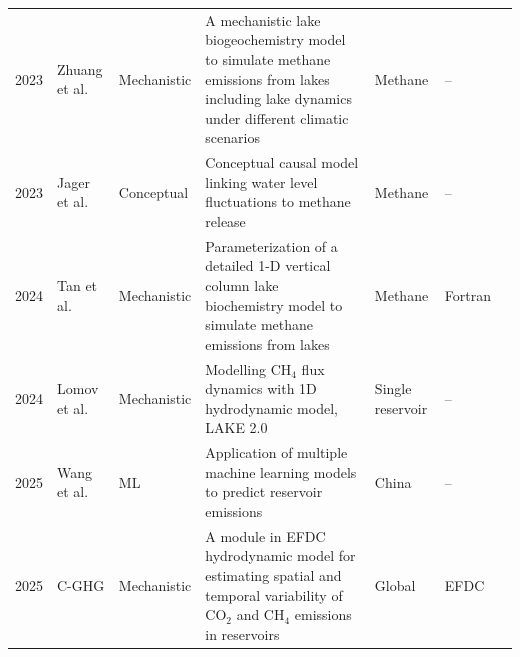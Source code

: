 \documentclass[final,1p,times]{elsarticle}
\begin{document}
\begin{table}
\begin{adjustbox}{max height=\textheight, center}
\begin{tabular}{p{0.03\textheight}p{0.11\textheight}p{0.07\textheight}p{0.48\textheight}p{0.10\textheight}p{0.09\textheight}p{0.12\textheight}}
2023 & Zhuang et al. & Mechanistic & A mechanistic lake biogeochemistry model to simulate methane emissions from lakes including lake dynamics under different climatic scenarios & Methane & -- & \citet{Zhuang2023} \\
2023 & Jager et al. & Conceptual & Conceptual causal model linking water level fluctuations to methane release & Methane & -- & \citet{Jager2023} \\
2024 & Tan et al. & Mechanistic & Parameterization of a detailed 1-D vertical column lake biochemistry model to simulate methane emissions from lakes & Methane & Fortran & \citet{Tan2024} \\
2024 & Lomov et al. & Mechanistic & Modelling CH$_4$ flux dynamics with 1D hydrodynamic model, LAKE 2.0 & Single reservoir & -- & \citet{Lomov2024} \\
2025 & Wang et al. & ML & Application of multiple machine learning models to predict reservoir emissions & China & -- & \citet{WANG2025123441} \\
2025 & C-GHG & Mechanistic & A module in EFDC hydrodynamic model for estimating spatial and temporal variability of CO$_2$ and CH$_4$ emissions in reservoirs & Global & EFDC & \citet{SHI2025} \\
\bottomrule
\end{tabular}%
\end{adjustbox}
\end{table}



\end{document}
